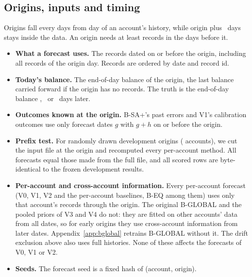 \subsection{Origins, inputs and timing}
Origins fall every
 days from day  of an account's history, while
origin plus \hC\ days stays inside the data. An origin needs at least
 records in the  days before it.
\begin{itemize}
\item \textbf{What a forecast uses.} The records dated on or before the
  origin, including all records of the origin day. Records are ordered by
  date and record id.
\item \textbf{Today's balance.} The end-of-day balance of the origin, the
  last balance carried forward if the origin has no records. The truth is
  the end-of-day balance \hA, \hB\ or \hC\ days later.
\item \textbf{Outcomes known at the origin.} B-SA+'s past errors and V1's
  calibration outcomes use only forecast dates $g$ with $g + h$ on or
  before the origin.
\item \textbf{Prefix test.} For  randomly drawn
  development origins ( accounts), we cut the input
  file at the origin and recomputed every per-account method. All
   forecasts equal those made from the
  full file, and all  scored rows are
  byte-identical to the frozen development results.
\item \textbf{Per-account and cross-account information.} Every
  per-account forecast (V0, V1, V2 and the per-account baselines,
  B-EQ among them) uses only that account's records through the origin.
  The original B-GLOBAL and the pooled priors of V3 and V4 do not: they
  are fitted on other accounts' data from all dates, so for early origins
  they use cross-account information from later dates.
  Appendix~\ref{app:bglobal} retrains B-GLOBAL without it. The drift
  exclusion above also uses full histories. None of these affects the
  forecasts of V0, V1 or V2.
\item \textbf{Seeds.} The forecast seed is a fixed hash of (account,
  origin).
\end{itemize}


